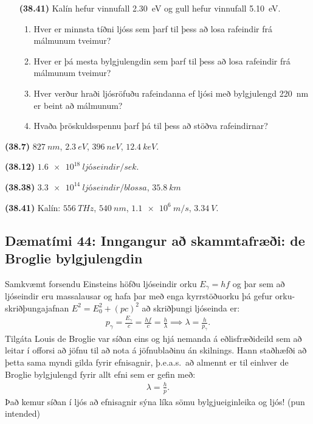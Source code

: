 \ifdefined \wholebook \else\documentclass[oneside]{book}\usepackage{EdlBook}\graphicspath{{figures/}}
\begin{document}
\begin{enumerate}[label = \textbf{(\alph*)}]
\item[\textbf{(38.41)}] Kalín hefur vinnufall \SI{2.30}{eV} og gull hefur vinnufall \SI{5.10}{eV}.
\begin{enumerate}[label = \textbf{(\alph*)}]
    \item Hver er minnsta tíðni ljóss sem þarf til þess að losa rafeindir frá málmunum tveimur?
    \item Hver er þá mesta bylgjulengdin sem þarf til þess að losa rafeindir frá málmunum tveimur?
    \item Hver verður hraði ljósröfuðu rafeindanna ef ljósi með bylgjulengd \SI{220}{nm} er beint að málmunum?
    \item Hvaða þröskuldsspennu þarf þá til þess að stöðva rafeindirnar?
\end{enumerate}

\end{enumerate}

\begin{tcolorbox}
\begin{enumerate*}[label = ]
  \item \textbf{(38.7)} $\SI{827}{nm}$, $\SI{2.3}{eV}$, $\SI{396}{neV}$, $\SI{12.4}{keV}$.
  \item \textbf{(38.12)} $\SI{1.6e18}{ljóseindir/sek}$. \\
  \item \textbf{(38.38)} $\SI{3.3e14}{ljóseindir/blossa}$, $\SI{35.8}{km}$
  \item \textbf{(38.41)} Kalín: $\SI{556}{THz}$, $\SI{540}{nm}$, $\SI{1.1e6}{m/s}$, $\SI{3.34}{V}$.
\end{enumerate*}
\end{tcolorbox}



\newpage

\subsection*{Dæmatími 44: Inngangur að skammtafræði: de Broglie bylgjulengdin}

\begin{tcolorbox}
Samkvæmt forsendu Einsteins höfðu ljóseindir orku $E_{\gamma} = hf$ og þar sem að ljóseindir eru massalausar og hafa þar með enga kyrrstöðuorku þá gefur orku-skriðþungajafnan $E^2 = E_0^2 + (pc)^2$ að skriðþungi ljóseinda er:
\begin{align*}
    p_\gamma = \frac{E_\gamma}{c} = \frac{hf}{c} = \frac{h}{\lambda} \implies \lambda = \frac{h}{p_\gamma}.
\end{align*}
Tilgáta Louis de Broglie var síðan eins og hjá nemanda á eðlisfræðideild sem að leitar í offorsi að jöfnu til að nota á jöfnublaðinu án skilnings. Hann staðhæfði að þetta sama myndi gilda fyrir efnisagnir, þ.e.a.s.~að almennt er til einhver de Broglie bylgjulengd fyrir allt efni sem er gefin með:
\begin{align*}
    \lambda = \frac{h}{p}.
\end{align*}
Það kemur síðan í ljós að efnisagnir sýna líka sömu bylgjueiginleika og ljós! (pun intended)
\end{tcolorbox}
\end{document}
